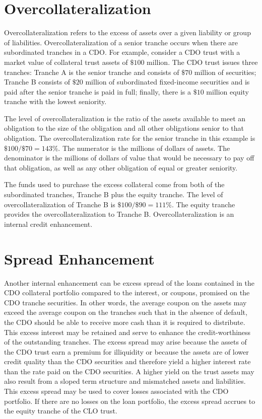 \documentclass[11pt]{article}
\begin{document}
\section*{Overcollateralization}
Overcollateralization refers to the excess of assets over a given liability or group of liabilities. Overcollateralization of a senior tranche occurs when there are subordinated tranches in a CDO. For example, consider a CDO trust with a market value of collateral trust assets of $\$ 100$ million. The CDO trust issues three tranches: Tranche A is the senior tranche and consists of $\$ 70$ million of securities; Tranche B consists of $\$ 20$ million of subordinated fixed-income securities and is paid after the senior tranche is paid in full; finally, there is a $\$ 10$ million equity tranche with the lowest seniority.

The level of overcollateralization is the ratio of the assets available to meet an obligation to the size of the obligation and all other obligations senior to that obligation. The overcollateralization rate for the senior tranche in this example is $\$ 100 / \$ 70=143 \%$. The numerator is the millions of dollars of assets. The denominator is the millions of dollars of value that would be necessary to pay off that obligation, as well as any other obligation of equal or greater seniority.

The funds used to purchase the excess collateral come from both of the subordinated tranches, Tranche B plus the equity tranche. The level of overcollateralization of Tranche B is $\$ 100 / \$ 90=111 \%$. The equity tranche provides the overcollateralization to Tranche B. Overcollateralization is an internal credit enhancement.

\section*{Spread Enhancement}
Another internal enhancement can be excess spread of the loans contained in the CDO collateral portfolio compared to the interest, or coupons, promised on the CDO tranche securities. In other words, the average coupon on the assets may exceed the average coupon on the tranches such that in the absence of default, the CDO should be able to receive more cash than it is required to distribute. This excess interest may be retained and serve to enhance the credit-worthiness of the outstanding tranches. The excess spread may arise because the assets of the CDO trust earn a premium for illiquidity or because the assets are of lower credit quality than the CDO securities and therefore yield a higher interest rate than the rate paid on the CDO securities. A higher yield on the trust assets may also result from a sloped term structure and mismatched assets and liabilities. This excess spread may be used to cover losses associated with the CDO portfolio. If there are no losses on the loan portfolio, the excess spread accrues to the equity tranche of the CLO trust.
\end{document}
